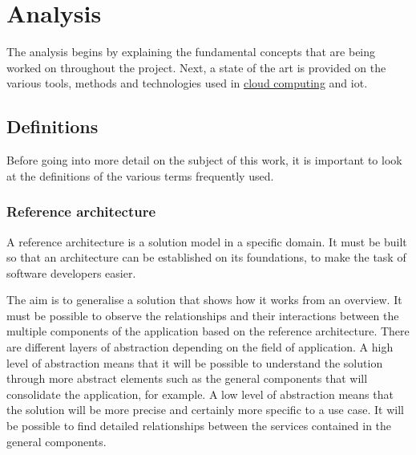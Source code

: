 

\chapter{Analysis}
\label{chap:analysis}

The analysis begins by explaining the fundamental concepts that are being worked on throughout the project. Next, a state of the art is provided on the various tools, methods and technologies used in \hyperref[subsec:cloudcomputing]{cloud computing} and \acrshort{iot}.

\minitoc
\newpage

\section{Definitions}
Before going into more detail on the subject of this work, it is important to look at the definitions of the various terms frequently used.

\subsection{Reference architecture}
\label{subsec:ref_arch}
A reference architecture is a solution model in a specific domain. It must be built so that an architecture can be established on its foundations, to make the task of software developers easier.

The aim is to generalise a solution that shows how it works from an overview. It must be possible to observe the relationships and their interactions between the multiple components of the application based on the reference architecture. There are different layers of abstraction depending on the field of application. A high level of abstraction means that it will be possible to understand the solution through more abstract elements such as the general components that will consolidate the application, for example. A low level of abstraction means that the solution will be more precise and certainly more specific to a use case. It will be possible to find detailed relationships between the services contained in the general components.

